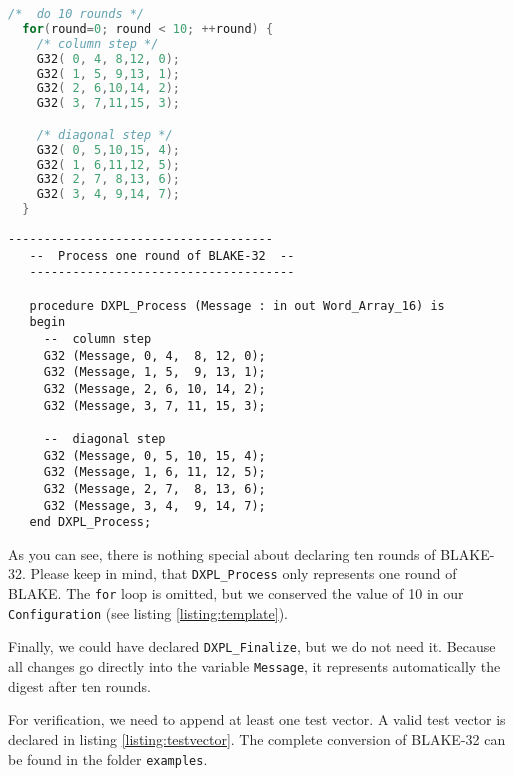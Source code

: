\documentclass{acmtrans2m}
\begin{document}
\begin{lstlisting}[language=C,caption={Declaration of ten rounds
of BLAKE-32 in C},label=listing:c4]
  /*  do 10 rounds */
  for(round=0; round < 10; ++round) {
    /* column step */
    G32( 0, 4, 8,12, 0);    
    G32( 1, 5, 9,13, 1);
    G32( 2, 6,10,14, 2);
    G32( 3, 7,11,15, 3);    

    /* diagonal step */
    G32( 0, 5,10,15, 4);
    G32( 1, 6,11,12, 5);
    G32( 2, 7, 8,13, 6);
    G32( 3, 4, 9,14, 7);
  }
\end{lstlisting}

\vfill

\begin{lstlisting}[caption={Declaring one round of BLAKE in Ada. For simplicity
and readability, we omitted the rest of the template.},label=listing:ada3]
   -------------------------------------
   --  Process one round of BLAKE-32  --
   -------------------------------------

   procedure DXPL_Process (Message : in out Word_Array_16) is
   begin
     --  column step
     G32 (Message, 0, 4,  8, 12, 0);
     G32 (Message, 1, 5,  9, 13, 1);
     G32 (Message, 2, 6, 10, 14, 2);
     G32 (Message, 3, 7, 11, 15, 3);    

     --  diagonal step
     G32 (Message, 0, 5, 10, 15, 4);
     G32 (Message, 1, 6, 11, 12, 5);
     G32 (Message, 2, 7,  8, 13, 6);
     G32 (Message, 3, 4,  9, 14, 7);
   end DXPL_Process;
\end{lstlisting}

As you can see, there is nothing special about declaring ten rounds of
BLAKE-32. Please keep in mind, that \texttt{DXPL\_Process} only represents
one round of BLAKE. The \texttt{for} loop is omitted, but we conserved the
value of 10 in our \texttt{Configuration} (see listing \ref{listing:template}).

Finally, we could have declared \texttt{DXPL\_Finalize}, but we do not 
need it. Because all changes go directly into the variable \texttt{Message},
it represents automatically the digest after ten rounds.

\bigbreak

For verification, we need to append at least one test vector. A valid test
vector is declared in listing \ref{listing:testvector}. The complete conversion of BLAKE-32 can be found in the folder \texttt{examples}.
\end{document}
